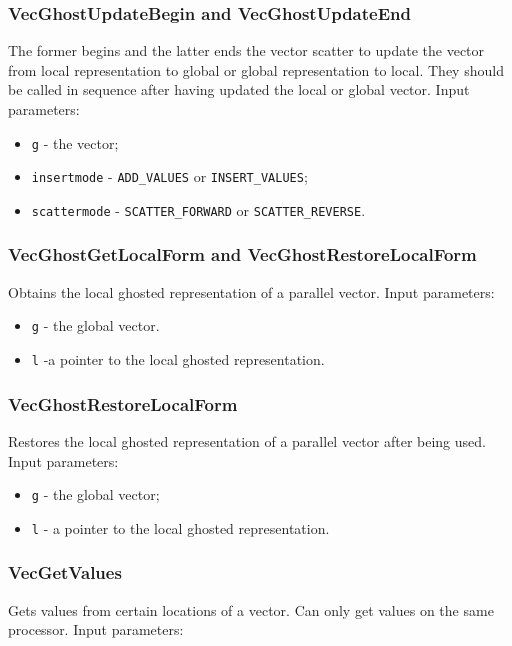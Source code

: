 \subsubsection{VecGhostUpdateBegin and VecGhostUpdateEnd}\label{subsubsection:VecGhostUpdate}
The former begins and the latter ends the vector scatter to update the vector from local representation to global or global representation to local. They should be called in sequence after having updated the local or global vector. Input parameters:

\begin{itemize}
\item \verb|g| - the vector;
\item \verb|insertmode| - \verb|ADD_VALUES| or \verb|INSERT_VALUES|;
\item \verb|scattermode| - \verb|SCATTER_FORWARD| or \verb|SCATTER_REVERSE|.
\end{itemize}

\subsubsection{VecGhostGetLocalForm and VecGhostRestoreLocalForm}\label{subsubsection:VecGhostGetLocalForm}
Obtains the local ghosted representation of a parallel vector. Input parameters:

\begin{itemize}
\item \verb|g| - the global vector.
\end{itemize}
\begin{itemize}
\item \verb|l| -a pointer to the local ghosted representation.
\end{itemize}

\subsubsection{VecGhostRestoreLocalForm}\label{subsubsection:VecGhostRestoreLocalForm}
Restores the local ghosted representation of a parallel vector after being used. Input parameters:

\begin{itemize}
\item \verb|g| - the global vector;
\item \verb|l| - a pointer to the local ghosted representation.
\end{itemize}

\subsubsection{VecGetValues}\label{subsubsection:VecGetValues}
Gets values from certain locations of a vector. Can only get values on the same processor. Input parameters:

